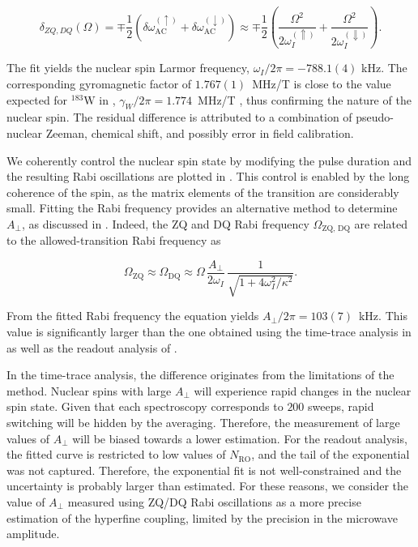 \begin{equation}
\delta_{ZQ, DQ}(\Omega) = \mp \frac{1}{2} \left(\delta\omega^{(\uparrow)}_\mathrm{AC} + \delta\omega^{(\downarrow)}_\mathrm{AC}\right) \approx \mp \frac{1}{2} \left(\frac{\Omega^{2}}{2\omega_I^{(\Uparrow)}} + \frac{\Omega^{2}}{2\omega_I^{(\Downarrow)}}\right).
\end{equation}

The fit yields the nuclear spin Larmor frequency, $\omega_I/2\pi = - 788.1(4)$ kHz. The corresponding gyromagnetic factor of $1.767(1)$~MHz/T is close to the value expected for $^{183}\mathrm{W}$ in \Ca, $\gamma_W/2\pi = 1.774$~MHz/T , thus confirming the nature of the nuclear spin. The residual difference is attributed to a combination of pseudo-nuclear Zeeman, chemical shift, and possibly error in field calibration.

We coherently control the nuclear spin state by modifying the pulse duration and the resulting Rabi oscillations are plotted in . This control is enabled by the long coherence of the \Er spin, as the matrix elements of the transition are considerably small. Fitting the Rabi frequency provides an alternative method to determine $A_\perp$, as discussed in . Indeed, the ZQ and DQ Rabi frequency $\Omega_\text{ZQ, DQ}$ are related to the allowed-transition Rabi frequency as 

\begin{equation}
    \Omega_{\text{ZQ}} \approx \Omega_{\text{DQ}} \approx \Omega \, \frac{A_\perp}{2\omega_I}\,\frac{1}{\sqrt{1+4\omega_I^2/\kappa^2}}.
\end{equation}

From the fitted Rabi frequency the equation yields $A_\perp/2\pi=103(7)$~kHz. This value is significantly larger than the one obtained using the time-trace analysis in  as well as the readout analysis of . 

In the time-trace analysis, the difference originates from the limitations of the method. Nuclear spins with large $A_\perp$ will experience rapid changes in the nuclear spin state. Given that each spectroscopy corresponds to $200$ sweeps, rapid switching will be hidden by the averaging. Therefore, the measurement of large values of $A_\perp$ will be biased towards a lower estimation. For the readout analysis, the fitted curve is restricted to low values of $N_\text{RO}$, and the tail of the exponential was not captured. Therefore, the exponential fit is not well-constrained and the uncertainty is probably larger than estimated. For these reasons, we consider the value of $A_\perp$ measured using ZQ/DQ Rabi oscillations as a more precise estimation of the hyperfine coupling, limited by the precision in the microwave amplitude. 

